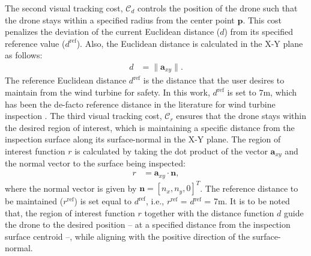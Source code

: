 The second visual tracking cost, $\mathcal{C}_{d}$ controls the position of the drone such that the drone stays within a specified radius from the center point $\mathbf{p}$. This cost penalizes the deviation of the current Euclidean distance ($d$) from its specified reference value ($d^\textrm{ref}$). Also, the Euclidean distance is calculated in the X-Y plane as follows:
\begin{align}\label{eq:euc_dist}
    d &= \| \mathbf{a}_{xy}\|.
\end{align}
The reference Euclidean distance $d^\textrm{ref}$ is the distance that the user desires to maintain from the wind turbine for safety. In this work, $d^{\textrm{ref}}$ is set to $7$m, which has been the de-facto reference distance in the literature for wind turbine inspection \cite{lidar2,stokkeland,ICUAS2020}. 
The third visual tracking cost, $\mathcal{C}_{r}$ ensures that the drone stays within the desired region of interest, which is maintaining a specific distance from the inspection surface along its surface-normal in the X-Y plane. The region of interest function $r$ is calculated by taking the dot product of the vector $\mathbf{a}_{xy}$ and the normal vector to the surface being inspected:
%
\begin{align}\label{eq:roi_functon}
    r &= \mathbf{a}_{xy}\cdot \mathbf{n},
\end{align}
%
where the normal vector is given by $\mathbf{n} = [n_x, n_y, 0]^T$. The reference distance to be maintained ($r^\textrm{ref}$) is set equal to $d^{\textrm{ref}}$, i.e., $r^{\textrm{ref}}$ = $d{^\textrm{ref}}$ = 7m. It is to be noted that, the region of interest function $r$ together with the distance function $d$ guide the drone to the desired position -- at a specified distance from the inspection surface centroid --, while aligning with the positive direction of the surface-normal. \\
